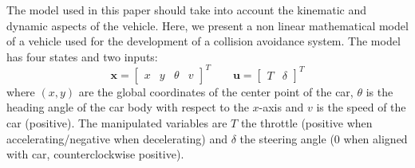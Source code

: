 \documentclass[conference, 11pt]{IEEEtran}
\begin{document}
The model used in this paper should take into account the kinematic and dynamic aspects of the vehicle. Here, we present a non linear mathematical model of a vehicle used for the development of a collision avoidance system.
The model has four states and two inputs:
\[ 
\textbf{x}=\begin{bmatrix}
   x&y&\theta&v 
  \end{bmatrix}^{T}
\qquad 
\textbf{u}=\begin{bmatrix}
T&\delta 
\end{bmatrix}^{T}
\]
where $(x,y)$ are the global coordinates of the center point of the car, $\theta$ is the heading angle of the car body with respect to the $x$-axis and $v$ is the speed of the car (positive). The manipulated variables are $T$ the throttle (positive when accelerating/negative when decelerating) and $\delta$ the steering angle ($0$ when aligned with car, counterclockwise positive).
\end{document}

